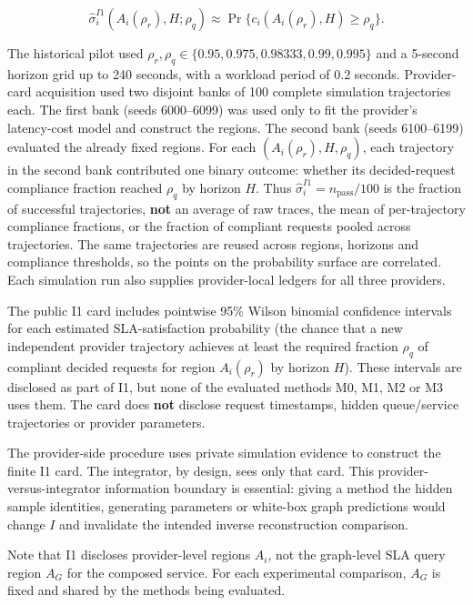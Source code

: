 \documentclass[10pt,a4paper]{article}
\begin{document}
\begin{equation*}
\widehat\sigma_i^{I1}(A_i(\rho_r),H;\rho_q)
\approx \Pr\{c_i(A_i(\rho_r),H)\ge\rho_q\}.
\tag{6}
\end{equation*}

The historical pilot used $\rho_r,\rho_q\in\{0.95,0.975,0.98333,0.99,0.995\}$ and a 5-second horizon grid up to 240 seconds, with a workload period of 0.2 seconds. Provider-card acquisition used two disjoint banks of 100 complete simulation trajectories each. The first bank (seeds 6000--6099) was used only to fit the provider's latency-cost model and construct the regions. The second bank (seeds 6100--6199) evaluated the already fixed regions. For each $(A_i(\rho_r),H,\rho_q)$, each trajectory in the second bank contributed one binary outcome: whether its decided-request compliance fraction reached $\rho_q$ by horizon $H$. Thus $\widehat\sigma_i^{I1}=n_{\mathrm{pass}}/100$ is the fraction of successful trajectories, \textbf{not} an average of raw traces, the mean of per-trajectory compliance fractions, or the fraction of compliant requests pooled across trajectories. The same trajectories are reused across regions, horizons and compliance thresholds, so the points on the probability surface are correlated. Each simulation run also supplies provider-local ledgers for all three providers.

The public I1 card includes pointwise 95\% Wilson binomial confidence intervals for each estimated SLA-satisfaction probability (the chance that a new independent provider trajectory achieves at least the required fraction $\rho_q$ of compliant decided requests for region $A_i(\rho_r)$ by horizon $H$). These intervals are disclosed as part of I1, but none of the evaluated methods M0, M1, M2 or M3 uses them. The card does \textbf{not} disclose request timestamps, hidden queue/service trajectories or provider parameters.

The provider-side procedure uses private simulation evidence to construct the finite I1 card. The integrator, by design, sees only that card. This provider-versus-integrator information boundary is essential: giving a method the hidden sample identities, generating parameters or white-box graph predictions would change $I$ and invalidate the intended inverse reconstruction comparison.

Note that I1 discloses provider-level regions $A_i$, not the graph-level SLA query region $A_G$ for the composed service. For each experimental comparison, $A_G$ is fixed and shared by the methods being evaluated.
\end{document}
